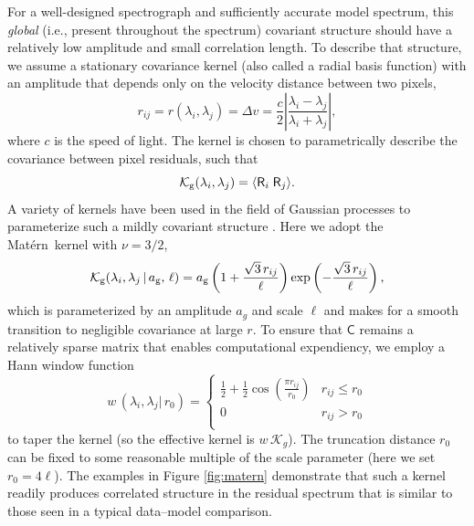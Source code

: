 \documentclass[iop,floatfix]{emulateapj}
\newcommand{\vR}{\mathsf{R}}
\newcommand{\vC}{\mathsf{C}}
\newcommand{\matern}{Mat\'{e}rn}
\begin{document}
For a well-designed spectrograph and sufficiently accurate model spectrum, this
{\it global} (i.e., present throughout the spectrum) covariant structure should
have a relatively low amplitude and small correlation length.  To describe that
structure, we assume a stationary covariance kernel (also called a radial basis
function) with an amplitude that depends only on the velocity distance between
two pixels, 
\begin{equation}
  r_{ij} = r(\lambda_i, \lambda_j) = \Delta v = \frac{c}{2} \left | \frac{\lambda_i 
   - \lambda_j}{ \lambda_i + \lambda_j} \right |,
\end{equation}
where $c$ is the speed of light.  The kernel is chosen to parametrically describe the covariance 
between pixel residuals, such that
\begin{equation}
  \mathcal{K}_{\rm g}(\lambda_i, \lambda_j) =  \langle \vR_i \; \vR_j \rangle.
  \label{eqn:expectation}
\end{equation}
A variety of kernels have been used in the field of Gaussian
processes to parameterize such a mildly covariant structure
\citep[e.g.,][]{rasmussen05}.  Here we adopt the \matern\ kernel with 
$\nu = 3/2$,
\begin{equation}
  \mathcal{K}_{\rm g}(\lambda_i, \lambda_j \, |\, a_{\rm g},\, \ell) = a_{\rm g} \left(1 + \frac{\sqrt{3}\, r_{ij}}{\ell} \right ) \exp 
   \left (- \frac{\sqrt{3}\, r_{ij}}{\ell} \right ),
\end{equation}
which is parameterized by an amplitude $a_g$ and scale $\ell$ and makes for a smooth transition to 
negligible covariance at large $r$.  To ensure that $\vC$ remains a relatively sparse matrix that 
enables computational expendiency, we employ a Hann window function
\begin{equation}
  w\,(\lambda_i, \lambda_j |\, r_0) = \left \{ 
    \begin{array}{cc}
    \frac{1}{2} + \frac{1}{2} \cos \left(\frac{\pi r_{ij}}{r_0} \right) & r_{ij} \le r_0 \\
    0 & r_{ij} > r_0 \\
  \end{array}
  \right .
  \label{eqn:Hann}
\end{equation}
to taper the kernel (so the effective kernel is $w \, \mathcal{K}_g$).  The truncation distance 
$r_0$ can be fixed to some reasonable multiple of the scale parameter (here we set $r_0 = 4\ell$).  
The examples in Figure \ref{fig:matern} demonstrate that such a kernel readily produces correlated 
structure in the residual spectrum that is similar to those seen in a typical data--model 
comparison.  
\end{document}
